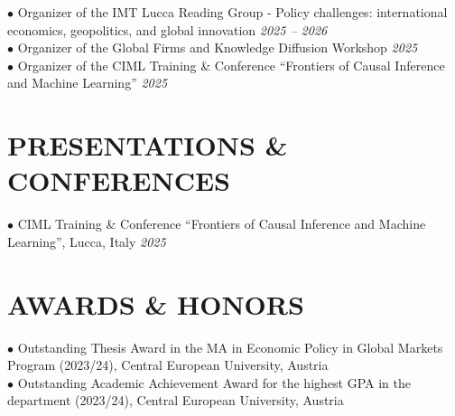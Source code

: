 \documentclass[11pt,a4paper]{article}
\newcommand{\activity}[2]{
  \noindent$\bullet$ #1 \textit{#2} \\[0.15cm]
}
\newcommand{\award}[1]{
  \noindent$\bullet$ #1 \\[0.15cm]
}
\begin{document}
\activity{Organizer of the IMT Lucca Reading Group - Policy challenges: international economics, geopolitics, and global innovation}{2025 -- 2026}

\activity{Organizer of the Global Firms and Knowledge Diffusion Workshop}{2025}

\activity{Organizer of the CIML Training \& Conference ``Frontiers of Causal Inference and Machine Learning''}{2025}

\section*{PRESENTATIONS \& CONFERENCES}

\activity{CIML Training \& Conference ``Frontiers of Causal Inference and Machine Learning'', Lucca, Italy}{2025}


\section*{AWARDS \& HONORS}

\award{Outstanding Thesis Award in the MA in Economic Policy in Global Markets Program (2023/24), Central European University, Austria}

\award{Outstanding Academic Achievement Award for the highest GPA in the department (2023/24), Central European University, Austria}
\end{document}
